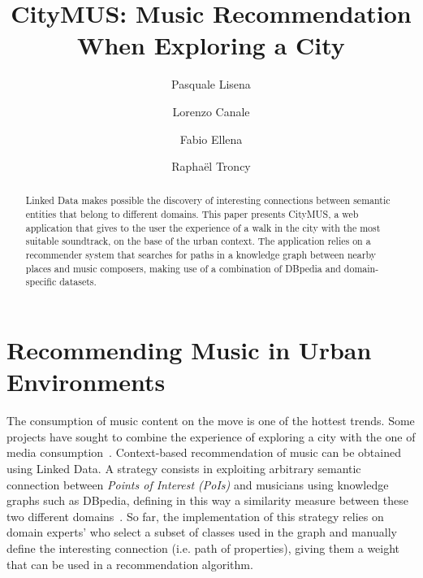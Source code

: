 \documentclass{llncs}
\begin{document}
\title{CityMUS: Music Recommendation\\When Exploring a City}

\author{Pasquale Lisena \and
Lorenzo Canale \and Fabio Ellena
\and Rapha\"el Troncy}

\maketitle


\begin{abstract}
Linked Data makes possible the discovery of interesting connections between semantic entities that belong to different domains. This paper presents CityMUS, a web application that gives to the user the experience of a walk in the city with the most suitable soundtrack, on the base of the urban context. The application relies on a recommender system that searches for paths in a knowledge graph between nearby places and music composers, making use of a combination of DBpedia and domain-specific datasets.
\end{abstract}


\section{Recommending Music in Urban Environments}
\label{sec:introduction}
The consumption of music content on the move is one of the hottest trends. Some projects have sought to combine the experience of exploring a city with the one of media consumption~\cite{braunhofer2013location,perez2015geolocation}.  Context-based recommendation of music can be obtained using Linked Data. A strategy consists in exploiting arbitrary semantic connection between \textit{Points of Interest (PoIs)} and musicians using knowledge graphs such as DBpedia, defining in this way a similarity measure between these two different domains~\cite{kaminskas2012knowledge}. So far, the implementation of this strategy relies on domain experts' who select a subset of classes used in the graph and manually define the interesting connection (i.e. path of properties), giving them a weight that can be used in a recommendation algorithm.
\end{document}
